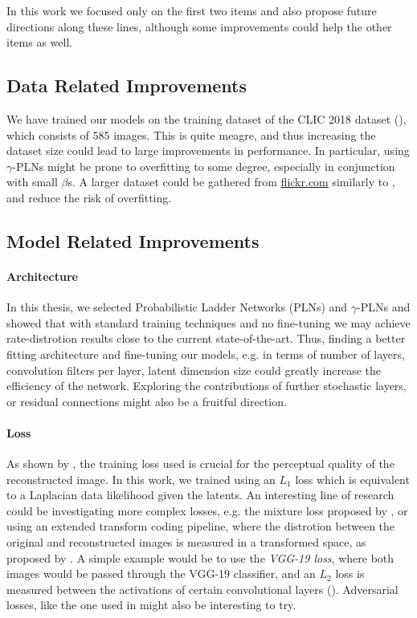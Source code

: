 In this work we focused only on the first two items and also propose future
directions along these lines, although some improvements could help the other
items as well.

\subsection{Data Related Improvements}
\par
We have trained our models on the training dataset of the CLIC 2018 dataset
(\cite{clic2018}), which consists of 585 images. This is quite meagre, and thus
increasing the dataset size could lead to large improvements in performance. In
particular, using $\gamma$-PLNs might be prone to overfitting to some degree,
especially in conjunction with small $\beta$s. A larger dataset could be
gathered from \url{flickr.com} similarly to \cite{theis2017lossy}, and reduce
the risk of overfitting.

\subsection{Model Related Improvements}
\paragraph{Architecture}
In this thesis, we selected Probabilistic Ladder Networks (PLNs) and
$\gamma$-PLNs and showed that with standard training techniques and no
fine-tuning we may achieve rate-distrotion results close to the current
state-of-the-art. Thus, finding a better fitting architecture and fine-tuning
our models, e.g. in terms of number of layers, convolution filters per layer,
latent dimension size could greatly increase the efficiency of the network.
Exploring the contributions of further stochastic layers, or residual
connections might also be a fruitful direction.

\paragraph{Loss}
As shown by \cite{zhao2015loss}, the training loss used is crucial for the
perceptual quality of the reconstructed image. In this work, we trained using an
$L_1$ loss which is equivalent to a Laplacian data likelihood given the latents.
An interesting line of research could be investigating more complex losses, e.g.
the mixture loss proposed by \cite{zhao2015loss}, or using an extended transform
coding pipeline, where the distrotion between the original and reconstructed
images is measured in a transformed space, as proposed by \cite{balle2016end}.
A simple example would be to use the \textit{VGG-19 loss}, where
both images would be passed through the VGG-19 classifier, and an $L_2$ loss is
measured between the activations of certain convolutional layers
(\cite{johnson2016perceptual}). Adversarial losses, like the one used in
\cite{rippel2017real} might also be interesting to try.

